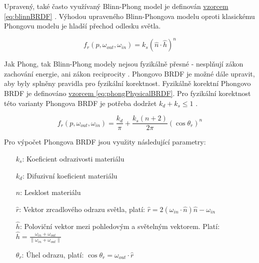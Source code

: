 \documentclass[czech,master,dept460,male,cpp,cpdeclaration]{diploma}
\newcommand{\uvec}[1]{\hat{#1}}
\begin{document}
Upravený, také často využívaný Blinn-Phong model je definován \hyperref[eq:blinnBRDF]{vzorcem \ref{eq:blinnBRDF}} \cite{BlinnPhong1977}. Výhodou upraveného Blinn-Phongova modelu oproti klasickému Phongovu modelu je hladší přechod odlesku světla.

\begin{equation} \label{eq:blinnBRDF}
    f_r\left(p,\omega_{out},\omega_{in}\right) = k_s(\uvec{n}\cdot\uvec{h})^n
\end{equation}

Jak Phong, tak Blinn-Phong modely nejsou fyzikálně přesné - nesplňují zákon zachování energie, ani zákon reciprocity \cite{BRDFOverview}. Phongovo BRDF je možné dále upravit, aby byly splněny pravidla pro fyzikální korektnost. Fyzikálně korektní Phongovo BRDF je definováno \hyperref[eq:phongPhysicalBRDF]{vzorcem \ref{eq:phongPhysicalBRDF}}. Pro fyzikální korektnost této varianty Phongova BRDF je potřeba dodržet \(k_d + k_s \leq 1\) \cite{LaFortunePhongBRDF}.

\begin{equation} \label{eq:phongPhysicalBRDF}
    f_r\left(p,\omega_{out},\omega_{in}\right) = \frac{k_d}{\pi} +
    \frac{k_s\left(n+2\right)}{2\pi}\left(\cos\theta_r\right)^n
\end{equation}

Pro výpočet Phongova BRDF jsou využity následující parametry:
\begin{itemize}
    \item[\(k_s\):] Koeficient odrazivosti materiálu
    \item[\(k_d\):] Difuzivní koeficient materiálu
    \item[\(n\):] Lesklost materiálu
    \item[\(\uvec{r}\):] Vektor zrcadlového odrazu světla, platí: \(\uvec{r} = 2\left(\omega_{in}\cdot\uvec{n}\right)\uvec{n}-\omega_{in}\)
    \item[\(\uvec{h}\):] Poloviční vektor mezi pohledovým a světelným vektorem. Platí: \(\uvec{h} = \frac{\omega_{in} + \omega_{out}}{\| \omega_{in} + \omega_{out}\|}\)
    \item[\(\theta_r\):] Úhel odrazu, platí: \(\cos\theta_r = \omega_{out}\cdot\uvec{r}\)
\end{itemize}
\end{document}
